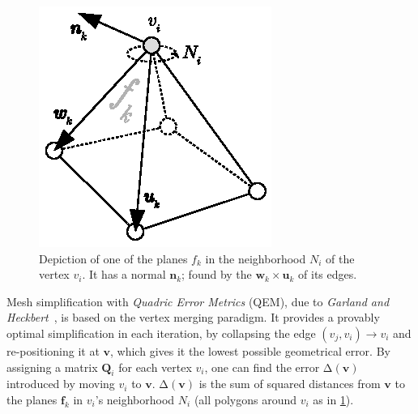 \begin{figure}[ht]
\begin{minipage}{0.485\textwidth}
        \includegraphics[width=\textwidth]{figures/quadric_planes.eps}
        \caption{Depiction of one of the planes \(f_k\) in the neighborhood \(N_i\) of the vertex \(v_i\). It has a normal \(\mathbf{n}_k\); found by the \(\mathbf{w}_k \times \mathbf{u}_k\) of its edges.}
        \label{fig:quadrics}
    \end{minipage}
\end{figure}
\fi %

Mesh simplification with \emph{Quadric Error Metrics} (QEM), due to \emph{Garland and Heckbert}~\cite{garland1997surface}, is based on the vertex merging paradigm. It provides a provably optimal simplification in each iteration, by collapsing the edge \((v_j, v_i) \rightarrow v_i\) and re-positioning it at \(\mathbf{v}\), which gives it the lowest possible geometrical error. By assigning a matrix \(\mathbf{Q}_i\) for each vertex \(v_i\), one can find the error \(\mathup\Delta(\mathbf{v})\) introduced by moving \(v_i\) to \(\mathbf{v}\). \(\mathup\Delta(\mathbf{v})\) is the sum of squared distances from \(\mathbf{v}\) to the planes \(\mathbf{f}_k\) in \(v_i\)'s neighborhood \(N_i\) (all polygons around \(v_i\) as in \cref{fig:quadrics}).

